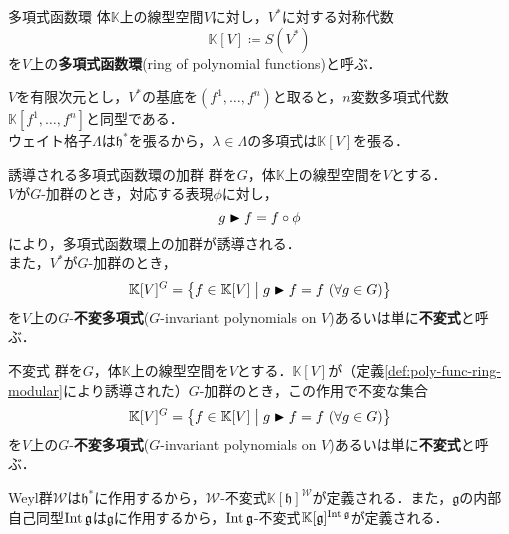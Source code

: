 \documentclass[rep_main]{subfiles}
\begin{document}
\begin{mydef}[label=def:polynomial-function-ring]{多項式函数環}
	体$\mathbb{K}$上の線型空間$V$に対し，$V^*$に対する対称代数
	\begin{equation}
		\mathbb{K}[V] \coloneqq S(V^*)
	\end{equation}
	を$V$上の\textbf{多項式函数環}(ring of polynomial functions)と呼ぶ．
\end{mydef}
$V$を有限次元とし，$V^*$の基底を$(f^1,\ldots , f^n)$と取ると，$n$変数多項式代数$\mathbb{K}[f^1, \ldots, f^n]$と同型である．\\
ウェイト格子$\Lambda$は$\mathfrak{h}^*$を張るから，$\lambda \in \Lambda$の多項式は$\mathbb{K}[V]$を張る．
\begin{mydef}[label=def:poly-func-ring-modular]{誘導される多項式函数環の加群}
	群を$G$，体$\mathbb{K}$上の線型空間を$V$とする．\\
	$V$が$G$-加群のとき，対応する表現$\phi$に対し，
	\begin{equation}
		g \blacktriangleright f = f \circ \phi
	\end{equation}
	により，多項式函数環上の加群が誘導される．\\
	また，$V^*$が$G$-加群のとき，
	\begin{equation}
		\mathbb{K}[V]^G = \bigl\{f \in \mathbb{K}[V] \bigm| g \blacktriangleright f = f\ (\forall g \in G) \bigr\}
	\end{equation}
	を$V$上の$G$-\textbf{不変多項式}($G$-invariant polynomials on $V$)あるいは単に\textbf{不変式}と呼ぶ．
\end{mydef}
\begin{mydef}[label=def:invariant-polynomial]{不変式}
	群を$G$，体$\mathbb{K}$上の線型空間を$V$とする．$\mathbb{K}[V]$が（定義\ref{def:poly-func-ring-modular}により誘導された）$G$-加群のとき，この作用で不変な集合
	\begin{equation}
		\mathbb{K}[V]^G = \bigl\{f \in \mathbb{K}[V] \bigm| g \blacktriangleright f = f\ (\forall g \in G) \bigr\}
	\end{equation}
	を$V$上の$G$-\textbf{不変多項式}($G$-invariant polynomials on $V$)あるいは単に\textbf{不変式}と呼ぶ．
\end{mydef}
Weyl群$\mathscr{W}$は$\mathfrak{h}^*$に作用するから，$\mathscr{W}$-不変式$\mathbb{K}[\mathfrak{h}]^\mathscr{W}$が定義される．また，$\mathfrak{g}$の内部自己同型$\operatorname{Int}\mathfrak{g}$は$\mathfrak{g}$に作用するから，$\operatorname{Int}\mathfrak{g}$-不変式$\mathbb{K}[\mathfrak{g}]^{\operatorname{Int}\mathfrak{g}}$が定義される．
\end{document}
